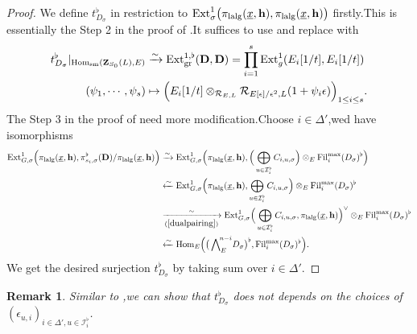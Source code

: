 \documentclass[10pt]{article}
\newtheorem{rmk}[thm]{Remark}
\newcommand{\fil}{{\rm Fil}}
\newcommand{\homo}{{\rm Hom}}
\newcommand{\ext}{{\rm Ext}}
\newcommand{\lalg}{{\rm lalg}}
\newcommand{\gr}{{\rm gr}}
\newcommand{\Dpik}{{\mathbf{D}}}
\newcommand{\bZ}{{\mathbf{Z}}}
\newcommand{\bh}{{\mathbf{h}}}
\newcommand{\cR}{\mathcal R}
\newcommand{\cI}{\mathcal I}
\begin{document}
\begin{proof}We define $t^{\flat}_{D_{\sigma}}$ in restriction to $\ext^1_{\sigma}\big(\pi_{\lalg}(\underline{x},\bh),\pi_{\lalg}(\underline{x},\bh)\big)$ firstly.\;This is essentially the Step 2 in the proof of \cite[Proposition 2.2.4]{BDcritical25}.\;It suffices to use \cite[(63)]{BDcritical25} and replace \cite[(64) \& (65)]{BDcritical25} with 
\begin{equation}
	\begin{aligned}
		t^{\flat}_{D_{\sigma}}|_{\homo_{\mathrm{sm}}(\bZ_{S_0}(L),E)}&\xrightarrow{\sim }\ext^{1,\flat}_{\gr}({\Dpik},{\Dpik})= \prod_{i=1}^s\ext^{1}_g(E_i[1/t],E_i[1/t])\\
		(\psi_1,\cdots,\psi_s)&\mapsto \Big(E_{i}[1/t]\otimes_{\cR_{E,L}}\cR_{E[\epsilon]/\epsilon^2,L}(1+\psi_{i}\epsilon)\Big)_{1\leq i\leq s}.
	\end{aligned}
\end{equation}
The Step 3 in the proof of \cite[Proposition 2.2.4]{BDcritical25} need more modification.\;Choose $i\in \Delta'$,\;wed have isomorphisms 
	\begin{equation}
		\begin{aligned}
			\ext^1_{G,\sigma}\Big(\pi_{\lalg}(\underline{x},\bh),\pi^{\flat}_{s_i,\sigma}(\Dpik)/\pi_{\lalg}(\underline{x},\bh)\Big)&\xrightarrow{\sim}\ext^1_{G,\sigma}\Big(\pi_{\lalg}(\underline{x},\bh),\Big(\bigoplus_{u\in \cI_{i}^{\flat}}C_{i,u,\sigma}\Big)\otimes_E\fil_i^{\max}(D_{\sigma})^{\flat}\Big)\\
			&\xleftarrow{\sim}\ext^1_{G,\sigma}\Big(\pi_{\lalg}(\underline{x},\bh),\bigoplus_{u\in\cI_{i}^{\flat}}C_{i,u,\sigma}\Big)\otimes_E\fil_i^{\max}(D_{\sigma})^{\flat}\\
			&\xrightarrow[(\ref{dualpairing})]{\sim}\ext^1_{G,\sigma}\Big(\bigoplus_{u\in \cI_{i}^{\flat}}C_{i,u,\sigma},\pi_{\lalg}(\underline{x},\bh)\Big)^{\vee}\otimes_E\fil_i^{\max}(D_{\sigma})^{\flat}\\
			&\xleftarrow{\sim}\homo_E\Big(\big(\bigwedge\nolimits_{E}^{\!n-i}\!D_{\sigma}\big)^{\flat},\fil_i^{\max}(D_{\sigma})^{\flat}\Big).
		\end{aligned}
	\end{equation}
We get the desired surjection $t^{\flat}_{D_{\sigma}}$ by taking sum over  $i\in \Delta'$.\;
\end{proof}
\begin{rmk}
Similar to \cite[Proposition 2.2.7]{BDcritical25},\;we can show that $t^{\flat}_{D_{\sigma}}$ does not depends on the choices of $(\epsilon_{u,i})_{i\in \Delta',u\in \cI_{i}^{\flat}}$.\;
\end{rmk}
\end{document}
